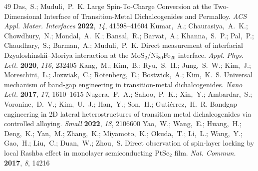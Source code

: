 \documentclass[journal=jacsat,manuscript=article]{achemso}
\begin{document}
\begin{mcitethebibliography}{49}
  Das,~S.; Muduli,~P.~K. Large Spin-To-Charge Conversion at the Two-Dimensional
  Interface of Transition-Metal Dichalcogenides and Permalloy. \emph{ACS Appl.
  Mater. Interfaces} \textbf{2022}, \emph{14}, 41598--41604\relax
\mciteBstWouldAddEndPuncttrue
\mciteSetBstMidEndSepPunct{\mcitedefaultmidpunct}
{\mcitedefaultendpunct}{\mcitedefaultseppunct}\relax
\EndOfBibitem
{}
Kumar,~A.; Chaurasiya,~A.~K.; Chowdhury,~N.; Mondal,~A.~K.; Bansal,~R.;
  Barvat,~A.; Khanna,~S.~P.; Pal,~P.; Chaudhary,~S.; Barman,~A.; Muduli,~P.~K.
  {Direct measurement of interfacial Dzyaloshinskii--Moriya interaction at the
  MoS$_2$/Ni$_{80}$Fe$_{20}$ interface}. \emph{Appl. Phys. Lett.}
  \textbf{2020}, \emph{116}, 232405\relax
\mciteBstWouldAddEndPuncttrue
\mciteSetBstMidEndSepPunct{\mcitedefaultmidpunct}
{\mcitedefaultendpunct}{\mcitedefaultseppunct}\relax
\EndOfBibitem
{}
Kang,~M.; Kim,~B.; Ryu,~S.~H.; Jung,~S.~W.; Kim,~J.; Moreschini,~L.;
  Jozwiak,~C.; Rotenberg,~E.; Bostwick,~A.; Kim,~K.~S. Universal mechanism of
  band-gap engineering in transition-metal dichalcogenides. \emph{Nano Lett.}
  \textbf{2017}, \emph{17}, 1610--1615\relax
\mciteBstWouldAddEndPuncttrue
\mciteSetBstMidEndSepPunct{\mcitedefaultmidpunct}
{\mcitedefaultendpunct}{\mcitedefaultseppunct}\relax
\EndOfBibitem
{}
Nugera,~F.~A.; Sahoo,~P.~K.; Xin,~Y.; Ambardar,~S.; Voronine,~D.~V.;
  Kim,~U.~J.; Han,~Y.; Son,~H.; Guti{\'e}rrez,~H.~R. Bandgap engineering in 2D
  lateral heterostructures of transition metal dichalcogenides via controlled
  alloying. \emph{Small} \textbf{2022}, \emph{18}, 2106600\relax
\mciteBstWouldAddEndPuncttrue
\mciteSetBstMidEndSepPunct{\mcitedefaultmidpunct}
{\mcitedefaultendpunct}{\mcitedefaultseppunct}\relax
\EndOfBibitem
{}
Yao,~W.; Wang,~E.; Huang,~H.; Deng,~K.; Yan,~M.; Zhang,~K.; Miyamoto,~K.;
  Okuda,~T.; Li,~L.; Wang,~Y.; Gao,~H.; Liu,~C.; Duan,~W.; Zhou,~S. Direct
  observation of spin-layer locking by local Rashba effect in monolayer
  semiconducting PtSe$_2$ film. \emph{Nat. Commun.} \textbf{2017}, \emph{8},
  14216\relax
\mciteBstWouldAddEndPuncttrue

\end{mcitethebibliography}
\end{document}
